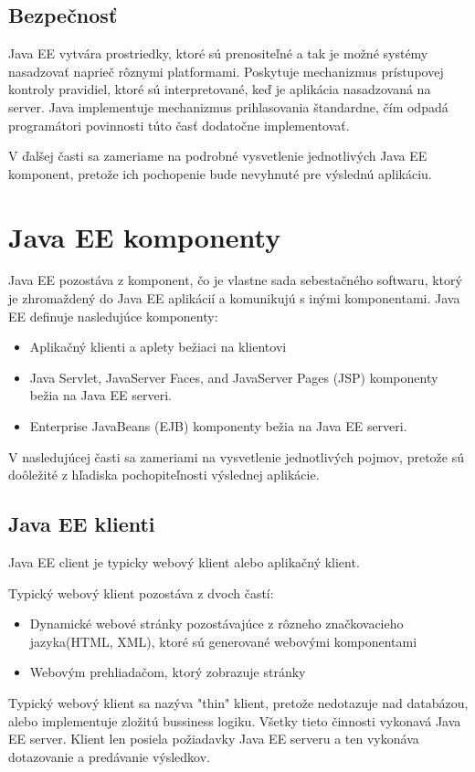 \section{Bezpečnosť}

Java EE  vytvára prostriedky, ktoré sú prenositeľné a tak je možné systémy nasadzovať naprieč rôznymi platformami. Poskytuje mechanizmus  prístupovej kontroly pravidiel, ktoré sú interpretované, keď je aplikácia nasadzovaná na server. Java implementuje mechanizmus prihlasovania štandardne, čím odpadá programátori povinnosti túto časť dodatočne implementovať.

V ďalšej časti sa zameriame na podrobné vysvetlenie jednotlivých Java EE komponent, pretože ich pochopenie bude nevyhnuté pre výslednú aplikáciu.


\chapter{Java EE komponenty}
Java EE pozostáva z komponent, čo je vlastne sada sebestačného softwaru, ktorý je zhromaždený do Java EE aplikácií a komunikujú s inými komponentami. Java EE definuje nasledujúce komponenty: 
\begin{itemize}
\item Aplikačný klienti a aplety bežiaci na klientovi
\item Java Servlet, JavaServer Faces, and JavaServer Pages (JSP) komponenty bežia na Java EE serveri\cite{fitWeb}.
\item Enterprise JavaBeans (EJB) komponenty bežia na Java EE serveri\cite{fitWeb}.
\end{itemize}

V nasledujúcej časti sa zameriami na vysvetlenie jednotlivých pojmov, pretože sú doôležité z hľadiska pochopiteľnosti výslednej aplikácie.

\section{Java EE klienti}
Java EE client je typicky webový klient alebo aplikačný klient.

Typický webový klient pozostáva z dvoch častí:
\begin{itemize}
\item Dynamické webové stránky pozostávajúce z rôzneho značkovacieho jazyka(HTML, XML), ktoré sú generované webovými komponentami
\item Webovým prehliadačom, ktorý zobrazuje stránky
\end{itemize}
Typický webový klient sa nazýva "thin" klient, pretože nedotazuje nad databázou, alebo implementuje zložitú bussiness logiku. Všetky tieto činnosti vykonavá Java EE server. Klient len posiela požiadavky Java EE serveru a ten vykonáva dotazovanie a predávanie výsledkov.


